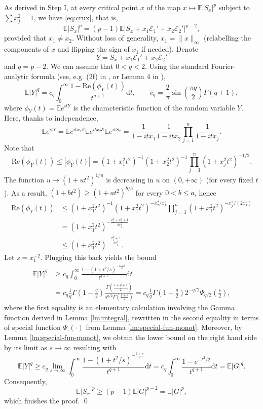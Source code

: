 \documentclass[10pt]{article}
\newcommand{\dd}{\mathrm{d}}
\newcommand{\E}{\mathbb{E}}
\newcommand{\1}{\textbf{1}}
\newcommand{\cE}{\mathscr{E}}
\theoremstyle{remark}
\theoremstyle{definition}
\begin{document}
As derived in Step I, at every critical point $x$ of the map $x \mapsto \E|S_x|^p$ subject to $\sum x_j^2 = 1$, we have \eqref{eq:crux}, that is,
\[ 
\E|S_x|^p = (p-1)\E|S_x + x_1\cE_1' + x_2\cE_2'|^{p-2},
 \]
provided that $x_1 \neq x_2$. Without loss of generality, $x_1 = \|x\|_\infty$ (relabelling the components of $x$ and flipping the sign of $x_1$ if needed). Denote 
\[
Y =  S_x + x_1\cE_1' + x_2\cE_2'
\]
and $q = p-2$. We can assume that $0 < q < 2$. Using the standard Fourier-analytic formula (see, e.g. (2f) in \cite{Haa}, or Lemma 4 in \cite{CGT}),
\begin{equation}\label{eq:Fourier}
\E|Y|^q = c_q\int_0^\infty \frac{1 - \mathrm{Re}(\phi_Y(t))}{t^{q+1}} \dd t, \qquad c_q = \frac{2}{\pi}\sin\left(\frac{\pi q}{2}\right)\Gamma(q+1),
 \end{equation}
where $\phi_Y(t) = \E e^{it Y}$ is the characteristic function of the random variable $Y$. Here, thanks to independence,
\[ 
\E e^{it Y} =\E e^{itx_1\cE}\E e^{itx_2 \cE}  \E e^{it S_x}= \frac{1}{1-itx_1}\frac{1}{1-itx_2}\prod_{j=1}^n \frac{1}{1-itx_j}.
 \]
Note that
\[ 
 \mathrm{Re}(\phi_Y(t)) \leq |\phi_Y(t)| = (1+x_1^2t^2)^{-1}(1+x_2^2t^2)^{-1}\prod_{j=3}^n (1+x_j^2t^2)^{-1/2}.
 \]
The function $u \mapsto (1+ut^2)^{1/u}$ is decreasing in $u$ on $(0,+\infty)$ (for every fixed $t$). As a result, $(1+bt^2) \geq (1+at^2)^{b/a}$ for every $0 < b \leq a$, hence
\begin{align*}
\mathrm{Re}(\phi_Y(t)) &\leq (1+x_1^2t^2)^{-1}(1+x_1^2t^2)^{-x_2^2/x_1^2}\prod_{j=3}^n (1+x_1^2t^2)^{-x_j^2/(2x_1^2)} \\
&= (1+x_1^2t^2)^{-\frac{x_1^2+x_2^2+1}{2x_1^2}} \\
&\leq (1+x_1^2t^2)^{-\frac{x_1^2+1}{2x_1^2}}.
 \end{align*}
Let $s = x_1^{-2}$. Plugging this back yields the bound
\begin{align*}
\E|Y|^q &\geq c_q\int_0^\infty \frac{1 - (1+t^2/s)^{-\frac{1+s}{2}}}{t^{q+1}} \dd t \\
&= c_q\frac{1}{q}\Gamma\left(1-\frac{q}{2}\right)\frac{\Gamma\left(\frac{1+q+s}{2}\right)}{s^{q/2}\Gamma\left(\frac{1+s}{2}\right)} = c_q\frac{1}{q}\Gamma\left(1-\frac{q}{2}\right)2^{-q/2}\Psi_{q/2}\left(\frac{s}{2}\right),
 \end{align*}
where the first equality is an elementary calculation involving the Gamma function derived in Lemma \ref{lm:integral}, rewritten in the second equality in terms of special function $\Psi_\cdot(\cdot)$ from Lemma \ref{lm:special-fun-monot}. Moreover, by Lemma \ref{lm:special-fun-monot}, we obtain the lower bound on the right hand side by its limit as $s \to \infty$ resulting with
\[ 
\E|Y|^q \geq c_q\lim_{s\to\infty}\int_0^\infty \frac{1 - (1+t^2/s)^{-\frac{1+s}{2}}}{t^{q+1}} \dd t = c_q\int_0^\infty \frac{1 - e^{-t^2/2}}{t^{q+1}} \dd t = \E|G|^q.
 \]
Consequently,
\[ 
\E|S_x|^p \geq (p-1)\E|G|^{p-2} = \E|G|^p,
 \]
which finishes the proof. \qed
\end{document}
